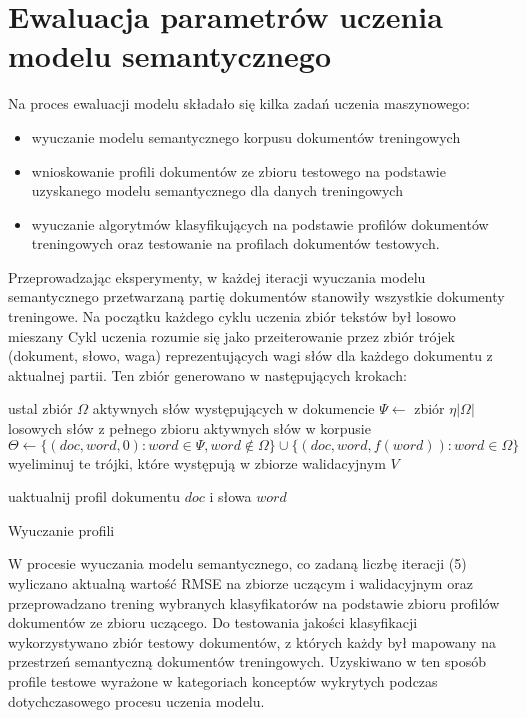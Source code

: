 \documentclass{pracamgr}
\newcommand{\abs}[1]{\lvert#1\rvert}
\begin{document}
\section{Ewaluacja parametrów uczenia modelu semantycznego}

Na proces ewaluacji modelu składało się kilka zadań uczenia maszynowego:
\begin{itemize}
    \item wyuczanie modelu semantycznego korpusu dokumentów treningowych
    \item wnioskowanie profili dokumentów ze zbioru testowego na podstawie uzyskanego modelu semantycznego dla danych treningowych
    \item wyuczanie algorytmów klasyfikujących na podstawie profilów dokumentów treningowych oraz testowanie na profilach dokumentów testowych.
\end{itemize}

Przeprowadzając eksperymenty, w każdej iteracji wyuczania modelu semantycznego przetwarzaną partię dokumentów stanowiły wszystkie dokumenty treningowe. Na początku każdego cyklu uczenia zbiór tekstów był losowo mieszany Cykl uczenia rozumie się jako przeiterowanie przez zbiór trójek (dokument, słowo, waga) reprezentujących wagi słów dla każdego dokumentu z aktualnej partii. Ten zbiór generowano w następujących krokach:

\begin{algorithm}[H]

 {
    ustal zbiór $\Omega$ aktywnych słów występujących w dokumencie\;
    $\Psi \gets $ zbiór $\eta \abs{\Omega}$ losowych słów z pełnego zbioru aktywnych słów w korpusie\;
    $\Theta \gets \{ (doc, word, 0) : word \in \Psi, word \notin \Omega\} \cup \{(doc, word, f(word)) : word \in \Omega\}$\;
    wyeliminuj te trójki, które występują w zbiorze walidacyjnym $V$\;
    
     { 
        uaktualnij profil dokumentu $doc$ i słowa $word$\;
    }
}

\caption{Wyuczanie profili}
\end{algorithm}

W procesie wyuczania modelu semantycznego, co zadaną liczbę iteracji (5) wyliczano aktualną wartość RMSE na zbiorze uczącym i walidacyjnym oraz przeprowadzano trening wybranych klasyfikatorów na podstawie zbioru profilów dokumentów ze zbioru uczącego. Do testowania jakości klasyfikacji wykorzystywano zbiór testowy dokumentów, z których każdy był mapowany na przestrzeń semantyczną dokumentów treningowych. Uzyskiwano w ten sposób profile testowe wyrażone w kategoriach konceptów wykrytych podczas dotychczasowego procesu uczenia modelu. 
\end{document}
